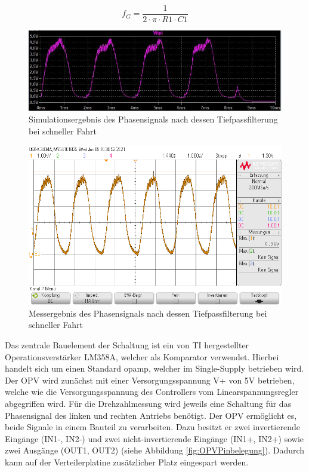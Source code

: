 \begin{equation}\label{eq4.2}
f_G = \frac{ 1 }{2 \cdot \pi \cdot R1\cdot C1 }
\end{equation}

\begin{figure}[H] %
\includegraphics[width=.90\textwidth]{sec4/images/Spannungsverlauf_TP} 
\centering
\captionsetup{width=.95\textwidth}
\caption[Simulationsergebnis des Phasensignals nach dessen Tiefpassfilterung]{Simulationsergebnis des Phasensignals nach dessen Tiefpassfilterung bei schneller Fahrt}\centering
\label{fig:SpannungsverlaufTPSpice}
\end{figure}

\begin{figure}[H] %
\includegraphics[width=.90\textwidth]{sec4/images/TP} 
\centering
\captionsetup{width=.95\textwidth}
\caption[Messergebnis des Phasensignals nach dessen Tiefpassfilterung]{Messergebnis des Phasensignals nach dessen Tiefpassfilterung bei schneller Fahrt}\centering
\label{fig:SpannungsverlaufTPReal}
\end{figure}

Das zentrale Bauelement der Schaltung ist ein von \ac{TI} hergestellter Operationsverstärker LM358A, welcher als Komparator verwendet. Hierbei handelt sich um einen Standard \ac{opamp}, welcher im Single-Supply betrieben wird. Der \ac{OPV} wird zunächst mit einer Versorgungsspannung V+ von 5V betrieben, welche wie die Versorgungsspannung des Controllers vom Linearspannungsregler abgegriffen wird. Für die Drehzahlmessung wird jeweils eine Schaltung für das Phasensignal des linken und rechten Antriebs benötigt. Der \ac{OPV} ermöglicht es, beide Signale in einem Bauteil zu verarbeiten. Dazu besitzt er zwei invertierende Eingänge (IN1-, IN2-) und zwei nicht-invertierende Eingänge (IN1+, IN2+) sowie zwei Ausgänge (OUT1, OUT2) (siehe Abbildung \ref{fig:OPVPinbelegung}). Dadurch kann auf der Verteilerplatine zusätzlicher Platz eingespart werden.

